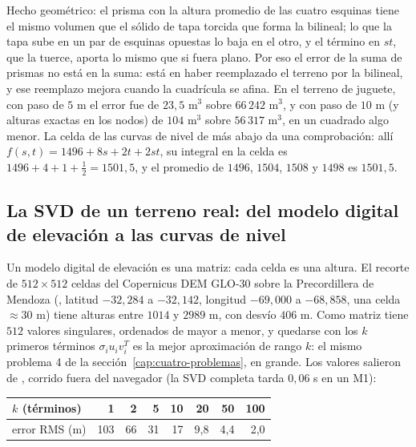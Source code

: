 Hecho geométrico: el prisma con la altura promedio de las cuatro esquinas tiene el mismo volumen
que el sólido de tapa torcida que forma la bilineal; lo que la tapa sube en un par de esquinas
opuestas lo baja en el otro, y el término en \(st\), que la tuerce, aporta lo mismo que si fuera
plano. Por eso el error de la suma de prismas no está en la suma: está en haber reemplazado el
terreno por la bilineal, y ese reemplazo mejora cuando la cuadrícula se afina. En el terreno de
juguete, con paso de \(5\) m el error fue de \(23{,}5\) m\(^3\) sobre \(66\,242\) m\(^3\), y con paso de
\(10\) m (y alturas exactas en los nodos) de \(104\) m\(^3\) sobre \(56\,317\) m\(^3\), en un cuadrado algo
menor. La celda de las curvas de nivel de más abajo da una comprobación: allí
\(f(s,t)=1496+8s+2t+2st\), su integral en la celda es \(1496+4+1+\tfrac12=1501{,}5\), y el promedio de
\(1496\), \(1504\), \(1508\) y \(1498\) es \(1501{,}5\).

\subsection{La SVD de un terreno real: del modelo digital de elevación a las curvas de nivel}\label{sec:svd-dem}
Un modelo digital de elevación es una
matriz: cada celda es una altura. El recorte de \(512\times512\) celdas del Copernicus DEM
GLO-30 sobre la Precordillera de Mendoza (, latitud
\(-32{,}284\) a \(-32{,}142\), longitud \(-69{,}000\) a \(-68{,}858\), una celda
\(\approx30\) m) tiene alturas entre \(1014\) y \(2989\) m, con desvío \(406\) m. Como
matriz tiene \(512\) valores singulares, ordenados de mayor a menor, y quedarse con los
\(k\) primeros términos \(\sigma_iu_iv_i^T\) es la mejor aproximación de rango \(k\): el
mismo problema 4 de la sección~\ref{cap:cuatro-problemas}, en grande. Los valores salieron
de , corrido fuera del navegador (la SVD completa tarda
\(0{,}06\) s en un M1):

{\small
\begin{center}
\begin{tabular}{l rrrrrrr}
\toprule
\(k\) (términos) & 1 & 2 & 5 & 10 & 20 & 50 & 100\\
\midrule
error RMS (m) & 103 & 66 & 31 & 17 & 9{,}8 & 4{,}4 & 2{,}0\\
\bottomrule
\end{tabular}
\end{center}
}

